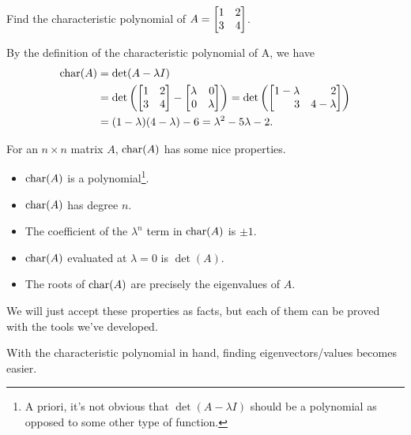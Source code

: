 
\begin{example}
	Find the characteristic polynomial of $A=\mat{1&2\\3&4}$.
	
	By the definition of the characteristic polynomial of A, we have
	\begin{align*}
	    \Char(A) &=\det(A-\lambda I)\\
	            &=\det\left(\mat{1&2\\3&4}-\mat{\lambda&0\\0&\lambda}\right)=\det\left(\mat{1-\lambda&2\\3&4-\lambda}\right)\\
	            &=(1-\lambda)(4-\lambda) - 6=\lambda^2 -5\lambda-2.
	\end{align*}
\end{example}
For an $n\times n$ matrix $A$, $\operatorname{char}(A)$ has some nice properties.
\begin{itemize}
	\item $\operatorname{char}(A)$ is a polynomial\footnote{ A priori, it's not obvious that $\det(A-\lambda I)$
	should be a polynomial as opposed to some other type of function.}.
	\item $\operatorname{char}(A)$ has degree $n$.
	\item The coefficient of the $\lambda^n$ term in $\operatorname{char}(A)$ is $\pm1$.
	\item $\operatorname{char}(A)$ evaluated at $\lambda = 0$ is $\det(A)$.
	\item The roots of $\operatorname{char}(A)$ are precisely the eigenvalues of $A$.
\end{itemize}
We will just accept these properties as facts, but each of them can be proved with the tools we've developed.


With the characteristic polynomial in hand, finding eigenvectors/values becomes easier.

